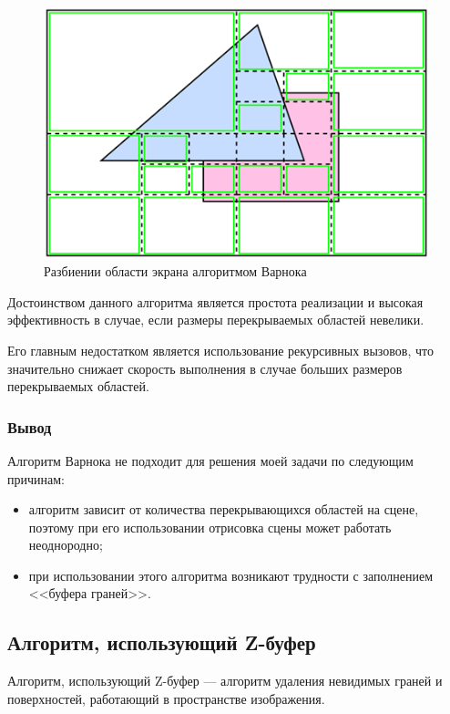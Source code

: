 \begin{figure}[h]
	\centering
	\includegraphics[scale=1]{inc/img/Varnok.png}
	\caption{Разбиении области экрана алгоритмом Варнока}
	\label{fig:varnok}
\end{figure} 

Достоинством данного алгоритма является простота реализации и высокая эффективность в случае, если размеры перекрываемых областей невелики.

Его главным недостатком является использование рекурсивных вызовов, что значительно снижает скорость выполнения в случае больших размеров перекрываемых областей.

\subsubsection*{Вывод}

Алгоритм Варнока не подходит для решения моей задачи по следующим причинам:

\begin{itemize}[label=---]
	\item алгоритм зависит от количества перекрывающихся областей на сцене, поэтому при его использовании отрисовка сцены может работать неоднородно;
	\item при использовании этого алгоритма возникают трудности с заполнением <<буфера граней>>.
\end{itemize}

\subsection{Алгоритм, использующий Z-буфер}

Алгоритм, использующий Z-буфер \cite{rogers_alg} --- алгоритм удаления невидимых граней и поверхностей, работающий в пространстве изображения.

